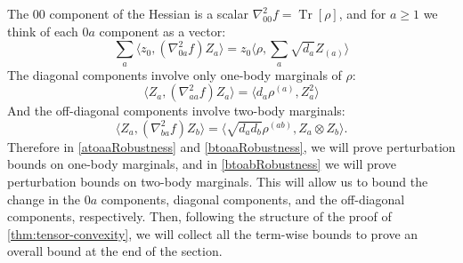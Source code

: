 \documentclass[aos]{imsart}
\theoremstyle{definition}
\numberwithin{equation}{section}
\DeclareMathOperator{\tr}{Tr}
\begin{document}
\begin{appendix}
\noindent The $00$ component of the Hessian is a scalar $\nabla^{2}_{00} f = \tr[\rho]$, and for $a \geq 1$ we think of each $0a$ component as a vector:
\[ \sum_{a} \langle z_{0}, (\nabla^{2}_{0a} f) Z_{a} \rangle = z_{0} \langle \rho, \sum_{a} \sqrt{d_{a}} Z_{(a)} \rangle       \]
The diagonal components involve only one-body marginals of $\rho$:
\[ \langle Z_{a}, (\nabla^{2}_{aa} f) Z_{a} \rangle = \langle d_{a} \rho^{(a)}, Z_{a}^{2} \rangle       \]
And the off-diagonal components involve two-body marginals:
\[ \langle Z_{a}, (\nabla^{2}_{ba} f) Z_{b} \rangle =  \langle \sqrt{d_{a} d_{b}} \rho^{(ab)}, Z_{a} \otimes Z_{b} \rangle.   \]
Therefore in \cref{atoaaRobustness} and \cref{btoaaRobustness}, we will prove perturbation bounds on one-body marginals, and in \cref{btoabRobustness} we will prove perturbation bounds on two-body marginals. This will allow us to bound the change in the $0a$ components, diagonal components, and the off-diagonal components, respectively.
Then, following the structure of the proof of \cref{thm:tensor-convexity}, we will collect all the term-wise bounds to prove an overall bound at the end of the section.




\end{appendix}
\end{document}
